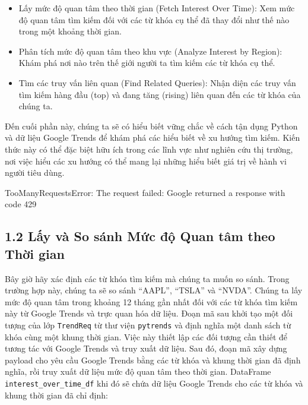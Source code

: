 \begin{itemize}
  \item Lấy mức độ quan tâm theo thời gian (Fetch Interest Over Time): Xem mức độ quan tâm tìm kiếm đối với các từ khóa cụ thể đã thay đổi như thế nào trong một khoảng thời gian.
  \item Phân tích mức độ quan tâm theo khu vực (Analyze Interest by Region): Khám phá nơi nào trên thế giới người ta tìm kiếm các từ khóa cụ thể.
  \item Tìm các truy vấn liên quan (Find Related Queries): Nhận diện các truy vấn tìm kiếm hàng đầu (top) và đang tăng (rising) liên quan đến các từ khóa của chúng ta.
\end{itemize}

Đến cuối phần này, chúng ta sẽ có hiểu biết vững chắc về cách tận dụng Python và dữ liệu Google Trends để khám phá các hiểu biết về xu hướng tìm kiếm. Kiến thức này có thể đặc biệt hữu ích trong các lĩnh vực như nghiên cứu thị trường, nơi việc hiểu các xu hướng có thể mang lại những hiểu biết giá trị về hành vi người tiêu dùng.

TooManyRequestsError: The request failed: Google returned a response with code 429

\subsection*{1.2 Lấy và So sánh Mức độ Quan tâm theo Thời gian}

Bây giờ hãy xác định các từ khóa tìm kiếm mà chúng ta muốn so sánh. Trong trường hợp này, chúng ta sẽ so sánh ``AAPL'', ``TSLA'' và ``NVDA''. Chúng ta lấy mức độ quan tâm trong khoảng 12 tháng gần nhất đối với các từ khóa tìm kiếm này từ Google Trends và trực quan hóa dữ liệu. Đoạn mã sau khởi tạo một đối tượng của lớp \texttt{TrendReq} từ thư viện \texttt{pytrends} và định nghĩa một danh sách từ khóa cùng một khung thời gian. Việc này thiết lập các đối tượng cần thiết để tương tác với Google Trends và truy xuất dữ liệu. Sau đó, đoạn mã xây dựng payload cho yêu cầu Google Trends bằng các từ khóa và khung thời gian đã định nghĩa, rồi truy xuất dữ liệu mức độ quan tâm theo thời gian. DataFrame \texttt{interest\_over\_time\_df} khi đó sẽ chứa dữ liệu Google Trends cho các từ khóa và khung thời gian đã chỉ định:

